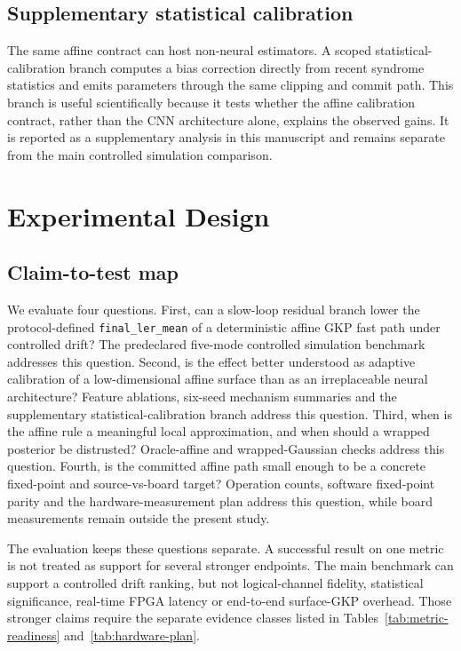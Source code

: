 \documentclass[11pt]{article}
\newcommand{\softwarehil}{controlled simulation}
\newcommand{\finalLER}{\texttt{final\_ler\_mean}}
\begin{document}
\subsection{Supplementary statistical calibration}

The same affine contract can host non-neural estimators.  A scoped
statistical-calibration branch computes a bias correction directly from recent
syndrome statistics and emits parameters through the same clipping and commit
path.  This branch is useful scientifically because it tests whether the
affine calibration contract, rather than the CNN architecture alone, explains
the observed gains.  It is reported as a supplementary analysis in this
manuscript and remains separate from the main \softwarehil{} comparison.

\section{Experimental Design}

\subsection{Claim-to-test map}

We evaluate four questions.  First, can a slow-loop residual branch lower the
protocol-defined \finalLER{} of a deterministic affine GKP fast path under
controlled drift?  The predeclared five-mode \softwarehil{} benchmark addresses
this question.  Second, is the effect better understood as adaptive calibration
of a low-dimensional affine surface than as an irreplaceable neural architecture?
Feature ablations, six-seed mechanism summaries and the supplementary
statistical-calibration branch address this question.  Third, when is the
affine rule a meaningful local approximation, and when should a wrapped
posterior be distrusted?  Oracle-affine and wrapped-Gaussian checks address this
question.  Fourth, is the committed affine path small enough to be a concrete
fixed-point and source-vs-board target?  Operation counts, software fixed-point
parity and the hardware-measurement plan address this question, while board
measurements remain outside the present study.

The evaluation keeps these questions separate.  A successful result on one
metric is not treated as support for several stronger endpoints.  The main
benchmark can support a controlled drift ranking, but not
logical-channel fidelity, statistical significance, real-time FPGA latency or
end-to-end surface-GKP overhead.  Those stronger claims require the separate
evidence classes listed in Tables~\ref{tab:metric-readiness}
and~\ref{tab:hardware-plan}.
\end{document}
